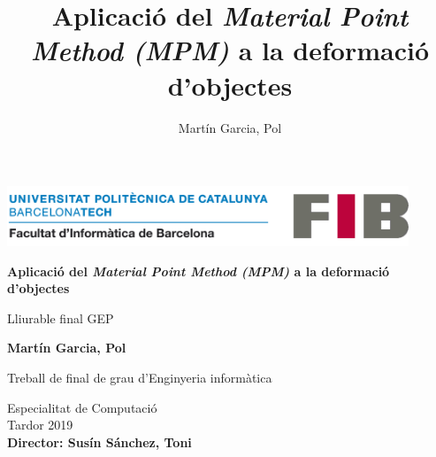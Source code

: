 \documentclass[a4paper]{article} %
\title{Aplicació del \textit{Material Point Method (MPM)} a la deformació d'objectes}
\author{Martín Garcia, Pol}
\date{\parbox{\linewidth}{\centering%
		2019, Quadrimestre de tardor\endgraf\bigskip
		Director: Susín Sánchez, Toni\endgraf \medskip
		Especialitat Computació \endgraf
}}
\begin{document}

\begin{titlepage}
	
	\begin{center}


	
		\includegraphics[width=12cm]{images/logo-fib.png} %
	\vfill
	
	\Huge
	\textbf{Aplicació del \textit{Material Point Method (MPM)} a la deformació d'objectes}  
	
	\vspace{0.5cm}
	\LARGE
	Lliurable final GEP

	\vspace{1.5cm}
	
	\textbf{Martín Garcia, Pol}

	\vfill
	
	Treball de final de grau d'Enginyeria informàtica
	
	\vspace{0.8cm}
	
	\Large
	Especialitat de Computació \\
	Tardor 2019 \\
	\vspace{0.5cm}
\textbf{Director: Susín Sánchez, Toni}
	\end{center}
\end{titlepage}


	\newpage
	

	\renewcommand{\contentsname}{Índex}
	\renewcommand{\cftsecfont}{\normalfont\bfseries}
	
	\tableofcontents
	\newpage
	


	\listoffigures
	\listoftables
\newpage
	\setcounter{page}{3}

\end{document}
